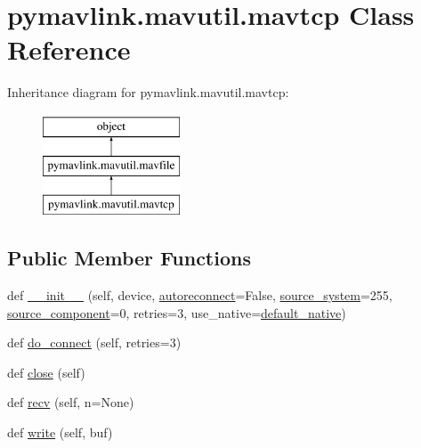 \hypertarget{classpymavlink_1_1mavutil_1_1mavtcp}{}\section{pymavlink.\+mavutil.\+mavtcp Class Reference}
\label{classpymavlink_1_1mavutil_1_1mavtcp}
Inheritance diagram for pymavlink.\+mavutil.\+mavtcp\+:\begin{figure}[H]
\begin{center}
\leavevmode
\includegraphics[height=3.000000cm]{classpymavlink_1_1mavutil_1_1mavtcp}
\end{center}
\end{figure}
\subsection*{Public Member Functions}
\begin{DoxyCompactItemize}
\item 
def \mbox{\hyperlink{classpymavlink_1_1mavutil_1_1mavtcp_adf1a689aad2d817c908756032df6629f}{\+\_\+\+\_\+init\+\_\+\+\_\+}} (self, device, \mbox{\hyperlink{classpymavlink_1_1mavutil_1_1mavtcp_adbcfafdf4396034a93ede2fb765a0a7c}{autoreconnect}}=False, \mbox{\hyperlink{classpymavlink_1_1mavutil_1_1mavfile_a02c06667c79f4414ed9c4ee6a8dec903}{source\+\_\+system}}=255, \mbox{\hyperlink{classpymavlink_1_1mavutil_1_1mavfile_a84e307f771a9ac2aed567831845c417e}{source\+\_\+component}}=0, retries=3, use\+\_\+native=\mbox{\hyperlink{namespacepymavlink_1_1mavutil_a21ce9da7b698a7bc21c44b9f77341b62}{default\+\_\+native}})
\item 
def \mbox{\hyperlink{classpymavlink_1_1mavutil_1_1mavtcp_a76425da5e48c4dd9e802879c8808b592}{do\+\_\+connect}} (self, retries=3)
\item 
def \mbox{\hyperlink{classpymavlink_1_1mavutil_1_1mavtcp_a4227bcbb84360f0016d9d4abb6af8107}{close}} (self)
\item 
def \mbox{\hyperlink{classpymavlink_1_1mavutil_1_1mavtcp_a8c56a0ee4f9c42f36534cd36bca997e1}{recv}} (self, n=None)
\item 
def \mbox{\hyperlink{classpymavlink_1_1mavutil_1_1mavtcp_abcc941efee4231016584e06c7cf07590}{write}} (self, buf)
\end{DoxyCompactItemize}
